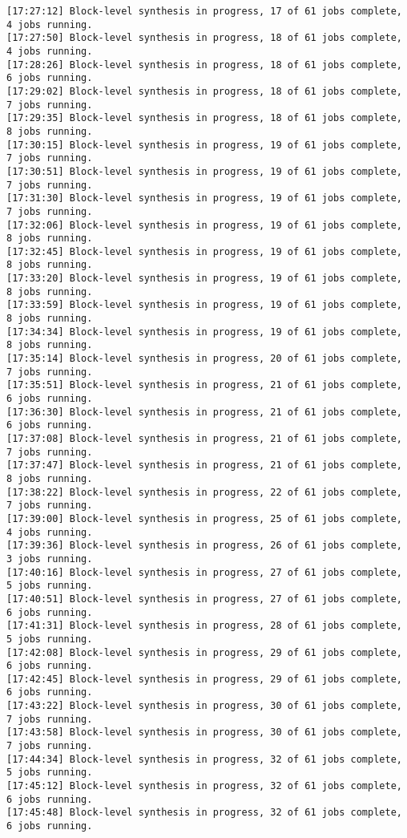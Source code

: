 \begin{lstlisting}[label=some-code-2,caption=Содержимое файла v++\_vinc.log]
[17:27:12] Block-level synthesis in progress, 17 of 61 jobs complete, 4 jobs running.
[17:27:50] Block-level synthesis in progress, 18 of 61 jobs complete, 4 jobs running.
[17:28:26] Block-level synthesis in progress, 18 of 61 jobs complete, 6 jobs running.
[17:29:02] Block-level synthesis in progress, 18 of 61 jobs complete, 7 jobs running.
[17:29:35] Block-level synthesis in progress, 18 of 61 jobs complete, 8 jobs running.
[17:30:15] Block-level synthesis in progress, 19 of 61 jobs complete, 7 jobs running.
[17:30:51] Block-level synthesis in progress, 19 of 61 jobs complete, 7 jobs running.
[17:31:30] Block-level synthesis in progress, 19 of 61 jobs complete, 7 jobs running.
[17:32:06] Block-level synthesis in progress, 19 of 61 jobs complete, 8 jobs running.
[17:32:45] Block-level synthesis in progress, 19 of 61 jobs complete, 8 jobs running.
[17:33:20] Block-level synthesis in progress, 19 of 61 jobs complete, 8 jobs running.
[17:33:59] Block-level synthesis in progress, 19 of 61 jobs complete, 8 jobs running.
[17:34:34] Block-level synthesis in progress, 19 of 61 jobs complete, 8 jobs running.
[17:35:14] Block-level synthesis in progress, 20 of 61 jobs complete, 7 jobs running.
[17:35:51] Block-level synthesis in progress, 21 of 61 jobs complete, 6 jobs running.
[17:36:30] Block-level synthesis in progress, 21 of 61 jobs complete, 6 jobs running.
[17:37:08] Block-level synthesis in progress, 21 of 61 jobs complete, 7 jobs running.
[17:37:47] Block-level synthesis in progress, 21 of 61 jobs complete, 8 jobs running.
[17:38:22] Block-level synthesis in progress, 22 of 61 jobs complete, 7 jobs running.
[17:39:00] Block-level synthesis in progress, 25 of 61 jobs complete, 4 jobs running.
[17:39:36] Block-level synthesis in progress, 26 of 61 jobs complete, 3 jobs running.
[17:40:16] Block-level synthesis in progress, 27 of 61 jobs complete, 5 jobs running.
[17:40:51] Block-level synthesis in progress, 27 of 61 jobs complete, 6 jobs running.
[17:41:31] Block-level synthesis in progress, 28 of 61 jobs complete, 5 jobs running.
[17:42:08] Block-level synthesis in progress, 29 of 61 jobs complete, 6 jobs running.
[17:42:45] Block-level synthesis in progress, 29 of 61 jobs complete, 6 jobs running.
[17:43:22] Block-level synthesis in progress, 30 of 61 jobs complete, 7 jobs running.
[17:43:58] Block-level synthesis in progress, 30 of 61 jobs complete, 7 jobs running.
[17:44:34] Block-level synthesis in progress, 32 of 61 jobs complete, 5 jobs running.
[17:45:12] Block-level synthesis in progress, 32 of 61 jobs complete, 6 jobs running.
[17:45:48] Block-level synthesis in progress, 32 of 61 jobs complete, 6 jobs running.

\end{lstlisting}
